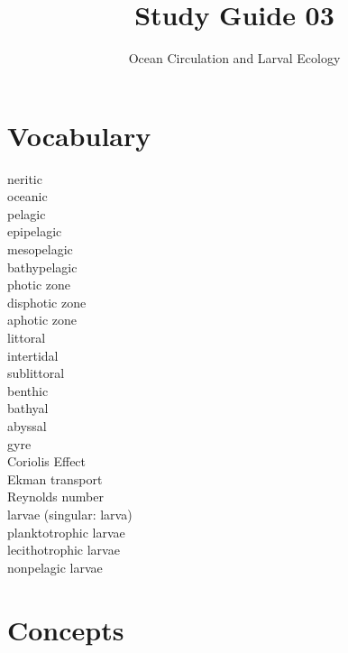 \documentclass[nofonts, letterpaper]{tufte-handout}
\title{Study Guide 03}
\author{Ocean Circulation and Larval Ecology}
\date{} %
\begin{document}
\maketitle	%


\section{Vocabulary}
\vspace{-1\baselineskip}
\begin{multicols}{2}
neritic \\
oceanic \\
pelagic \\
epipelagic \\
mesopelagic \\
bathypelagic \\
photic zone \\
disphotic zone\\
aphotic zone\\
littoral \\
intertidal \\
sublittoral \\
benthic \\
bathyal \\
abyssal \\
gyre \\
Coriolis Effect\\
Ekman transport\\
Reynolds number\\
larvae (singular: larva) \\
planktotrophic larvae \\
lecithotrophic larvae \\
nonpelagic larvae 
\end{multicols}

\section{Concepts}
\end{document}
